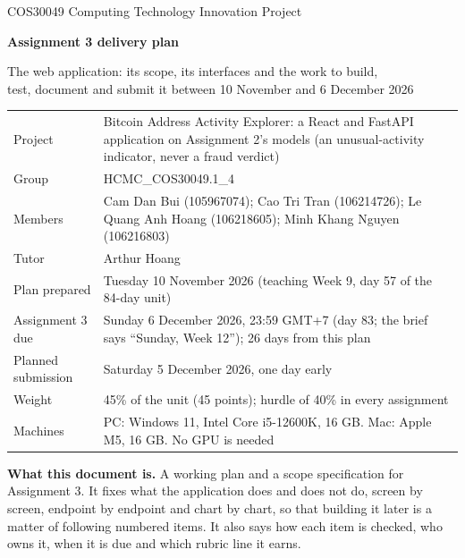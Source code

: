 \documentclass[a4paper,11pt]{article}
\begin{document}
\begin{titlepage}
\thispagestyle{empty}
\vspace*{1.2cm}
{\color{grey}\large COS30049 Computing Technology Innovation Project}\par
\vspace{0.4cm}
{\color{ink}\Huge\bfseries Assignment 3 delivery plan}\par
\vspace{0.3cm}
{\color{ink}\Large The web application: its scope, its interfaces and the work to build,\\ test, document and submit it between 10 November and 6 December 2026}\par
\vspace{1.0cm}
\begin{tabularx}{\textwidth}{@{}L{4.2cm}Y@{}}
\toprule
Project & Bitcoin Address Activity Explorer: a React and FastAPI application on Assignment 2's models (an unusual-activity indicator, never a fraud verdict) \\
Group & HCMC\_COS30049.1\_4 \\
Members & Cam Dan Bui (105967074); Cao Tri Tran (106214726); Le Quang Anh Hoang (106218605); Minh Khang Nguyen (106216803) \\
Tutor & Arthur Hoang \\
Plan prepared & Tuesday 10 November 2026 (teaching Week 9, day 57 of the 84-day unit) \\
Assignment 3 due & Sunday 6 December 2026, 23:59 GMT+7 (day 83; the brief says ``Sunday, Week 12''); 26 days from this plan \\
Planned submission & Saturday 5 December 2026, one day early \\
Weight & 45\% of the unit (45 points); hurdle of 40\% in every assignment \\
Machines & PC: Windows 11, Intel Core i5-12600K, 16 GB. Mac: Apple M5, 16 GB. No GPU is needed \\
\bottomrule
\end{tabularx}

\vspace{0.8cm}
\begin{summarybox}
\textbf{What this document is.} A working plan and a scope specification for Assignment 3. It
fixes what the application does and does not do, screen by screen, endpoint by endpoint and chart by
chart, so that building it later is a matter of following numbered items. It also says how each item
is checked, who owns it, when it is due and which rubric line it earns.


\end{summarybox}
\end{titlepage}
\end{document}
